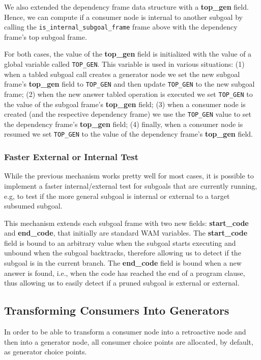 We also extended the dependency frame data structure with a \textbf{top\_gen} field.
Hence, we can compute if a consumer node is internal to another subgoal by calling
the \texttt{is\_internal\_subgoal\_frame} frame above with the dependency frame's top
subgoal frame.

For both cases, the value of the \textbf{top\_gen} field is initialized with the value
of a global variable called \texttt{TOP\_GEN}. This variable is used in various
situations: (1) when a tabled subgoal call creates a generator node we set the
new subgoal frame's \textbf{top\_gen} field to \texttt{TOP\_GEN} and then update
\texttt{TOP\_GEN} to the new subgoal frame; (2) when the new answer tabled operation
is executed we set \texttt{TOP\_GEN} to the value of the subgoal frame's \textbf{top\_gen}
field; (3) when a consumer node is created (and the respective dependency frame) we
use the \texttt{TOP\_GEN} value to set the dependency frame's \textbf{top\_gen} field;
(4) finally, when a consumer node is resumed we set \texttt{TOP\_GEN} to the value
of the dependency frame's \textbf{top\_gen} field.

\subsubsection{Faster External or Internal Test}

While the previous mechanism works pretty well for most cases, it is possible to
implement a faster internal/external test for subgoals that are currently running,
e.g, to test if the more general subgoal is internal or external to a target subsumed
subgoal.

This mechanism extends each subgoal frame with two new fields: \textbf{start\_code}
and \textbf{end\_code}, that initially are standard WAM variables.
The \textbf{start\_code} field is bound to an arbitrary value when the subgoal starts
executing and unbound when the subgoal backtracks, therefore allowing us to detect
if the subgoal is in the current branch. The \textbf{end\_code} field is bound
when a new answer is found, i.e., when the code has reached the end of a program
clause, thus allowing us to easily detect if a pruned subgoal is external or external.

\subsection{Transforming Consumers Into Generators}

In order to be able to transform a consumer node into a retroactive node and then into a generator node,
all consumer choice points are allocated, by default, as generator choice points.

